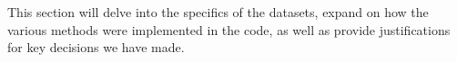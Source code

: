 This section will delve into the specifics of the datasets, expand on how the various methods were implemented in the code, as well as provide justifications for key decisions we have made.